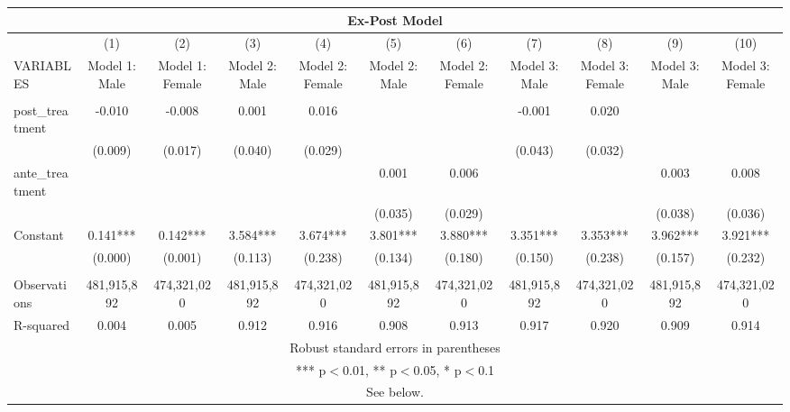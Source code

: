 \begin{tabular}{lcccccccccc}
\multicolumn{11}{c}{Ex-Post Model} \\ \hline
 & (1) & (2) & (3) & (4) & (5) & (6) & (7) & (8) & (9) & (10) \\
VARIABLES & Model 1: Male & Model 1: Female & Model 2: Male & Model 2: Female & Model 2: Male & Model 2: Female & Model 3: Male & Model 3: Female & Model 3: Male & Model 3: Female \\ \hline
 &  &  &  &  &  &  &  &  &  &  \\
post\_treatment & -0.010 & -0.008 & 0.001 & 0.016 &  &  & -0.001 & 0.020 &  &  \\
 & (0.009) & (0.017) & (0.040) & (0.029) &  &  & (0.043) & (0.032) &  &  \\
ante\_treatment &  &  &  &  & 0.001 & 0.006 &  &  & 0.003 & 0.008 \\
 &  &  &  &  & (0.035) & (0.029) &  &  & (0.038) & (0.036) \\
Constant & 0.141*** & 0.142*** & 3.584*** & 3.674*** & 3.801*** & 3.880*** & 3.351*** & 3.353*** & 3.962*** & 3.921*** \\
 & (0.000) & (0.001) & (0.113) & (0.238) & (0.134) & (0.180) & (0.150) & (0.238) & (0.157) & (0.232) \\
 &  &  &  &  &  &  &  &  &  &  \\
Observations & 481,915,892 & 474,321,020 & 481,915,892 & 474,321,020 & 481,915,892 & 474,321,020 & 481,915,892 & 474,321,020 & 481,915,892 & 474,321,020 \\
 R-squared & 0.004 & 0.005 & 0.912 & 0.916 & 0.908 & 0.913 & 0.917 & 0.920 & 0.909 & 0.914 \\ \hline
\multicolumn{11}{c}{ Robust standard errors in parentheses} \\
\multicolumn{11}{c}{ *** p$<$0.01, ** p$<$0.05, * p$<$0.1} \\
\multicolumn{11}{c}{ See below.} \\
\end{tabular}

